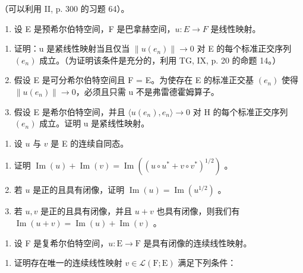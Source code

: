 （可以利用 II, p. 300 的习题 64）。

\begin{enumerate}
\def\labelenumi{\arabic{enumi})}
\setcounter{enumi}{5}
\tightlist
\item
  设 E 是预希尔伯特空间，F 是巴拿赫空间，\(u: E \rightarrow F\) 是线性映射。
\end{enumerate}

\begin{enumerate}
\def\labelenumi{\alph{enumi})}
\item
  证明：u 是紧线性映射当且仅当 \(\|u(e_{n})\|\to0\) 对 E 的每个标准正交序列 \((e_{n})\) 成立。（为证明该条件是充分的，利用 TG, IX, p. 20 的命题 14。）
\item
  假设 E 是可分希尔伯特空间且 F = E。为使存在 E 的标准正交基 \((e_{n})\) 使得 \(\|u(e_{n})\| \to 0\)，必须且只需 u 不是弗雷德霍姆算子。
\item
  假设 E 是希尔伯特空间，并且 \(\langle u(e_{n}), e_{n} \rangle \to 0\) 对 H 的每个标准正交序列 \((e_{n})\) 成立。证明 u 是紧线性映射。
\end{enumerate}

\begin{enumerate}
\def\labelenumi{\arabic{enumi})}
\setcounter{enumi}{6}
\tightlist
\item
  设 \(u\) 与 \(v\) 是 E 的连续自同态。
\end{enumerate}

\begin{enumerate}
\def\labelenumi{\alph{enumi})}
\item
  证明 \(\operatorname{Im}(u) + \operatorname{Im}(v) = \operatorname{Im}((u \circ u^* + v \circ v^*)^{1/2})\) 。
\item
  若 \(u\) 是正的且具有闭像，证明 \(\operatorname{Im}(u) = \operatorname{Im}(u^{1/2})\) 。
\item
  若 \(u, v\) 是正的且具有闭像，并且 \(u + v\) 也具有闭像，则我们有 \(\operatorname{Im}(u + v) = \operatorname{Im}(u) + \operatorname{Im}(v)\) 。
\end{enumerate}

\begin{enumerate}
\def\labelenumi{\arabic{enumi})}
\setcounter{enumi}{7}
\tightlist
\item
  设 F 是复希尔伯特空间，\(u \colon \mathrm{E} \to \mathrm{F}\) 是具有闭像的连续线性映射。
\end{enumerate}

\begin{enumerate}
\def\labelenumi{\alph{enumi})}
\tightlist
\item
  证明存在唯一的连续线性映射 \(v \in \mathcal{L}(\mathrm{F};\mathrm{E})\) 满足下列条件：
\end{enumerate}

